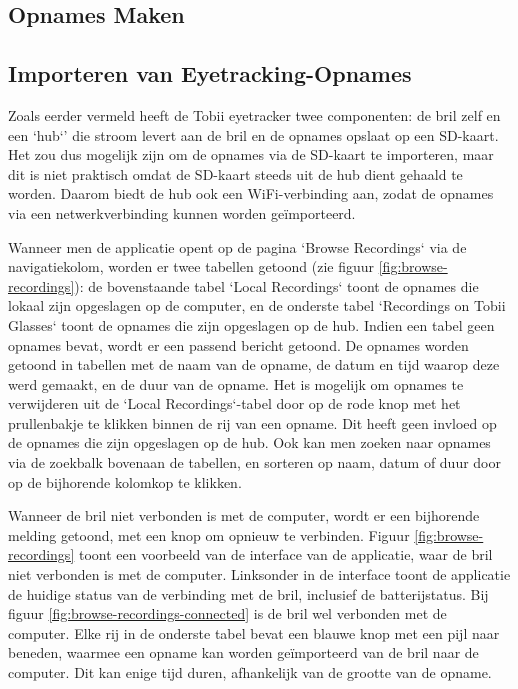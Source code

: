 \subsection{Opnames Maken}


\subsection{Importeren van Eyetracking-Opnames}

Zoals eerder vermeld heeft de Tobii eyetracker twee componenten: de bril zelf en een `hub`' die stroom levert aan de bril en de opnames opslaat op een SD-kaart.
Het zou dus mogelijk zijn om de opnames via de SD-kaart te importeren, maar dit is niet praktisch omdat de SD-kaart steeds uit de hub dient gehaald te worden.
Daarom biedt de hub ook een WiFi-verbinding aan, zodat de opnames via een netwerkverbinding kunnen worden geïmporteerd. 

Wanneer men de applicatie opent op de pagina `Browse Recordings` via de navigatiekolom, worden er twee tabellen getoond (zie figuur \ref{fig:browse-recordings}): de bovenstaande tabel `Local Recordings` toont de opnames die lokaal zijn opgeslagen op de computer, en de onderste tabel `Recordings on Tobii Glasses` toont de opnames die zijn opgeslagen op de hub.
Indien een tabel geen opnames bevat, wordt er een passend bericht getoond.
De opnames worden getoond in tabellen met de naam van de opname, de datum en tijd waarop deze werd gemaakt, en de duur van de opname. 
Het is mogelijk om opnames te verwijderen uit de `Local Recordings`-tabel door op de rode knop met het prullenbakje te klikken binnen de rij van een opname. Dit heeft geen invloed op de opnames die zijn opgeslagen op de hub.
Ook kan men zoeken naar opnames via de zoekbalk bovenaan de tabellen, en sorteren op naam, datum of duur door op de bijhorende kolomkop te klikken.

Wanneer de bril niet verbonden is met de computer, wordt er een bijhorende melding getoond, met een knop om opnieuw te verbinden. Figuur \ref{fig:browse-recordings} toont een voorbeeld van de interface van de applicatie, waar de bril niet verbonden is met de computer.
Linksonder in de interface toont de applicatie de huidige status van de verbinding met de bril, inclusief de batterijstatus. Bij figuur \ref{fig:browse-recordings-connected} is de bril wel verbonden met de computer. 
Elke rij in de onderste tabel bevat een blauwe knop met een pijl naar beneden, waarmee een opname kan worden geïmporteerd van de bril naar de computer. Dit kan enige tijd duren, afhankelijk van de grootte van de opname.

